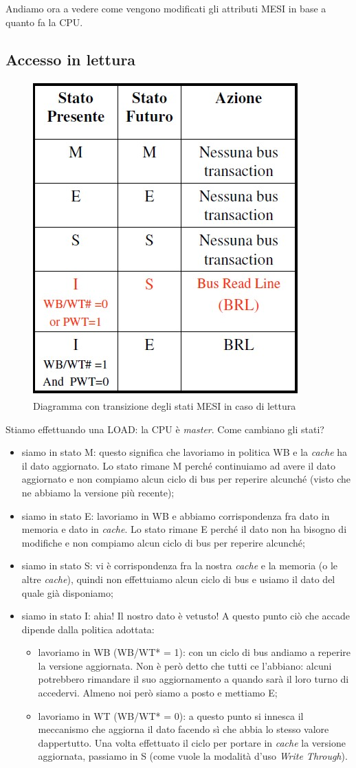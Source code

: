 Andiamo ora a vedere come vengono modificati gli attributi MESI in base a quanto fa la CPU.

\subsection{Accesso in lettura}
\label{sec:accessoLettura}

\begin{figure}[!h]
\centering
\includegraphics[width=0.35\columnwidth]{img/transLettura}
\caption{Diagramma con transizione degli stati MESI in caso di lettura}
\label{fig:transLettura}
\end{figure}

Stiamo effettuando una LOAD: la CPU è \textit{master}. Come cambiano gli stati?

\begin{itemize}
\item siamo in stato M: questo significa che lavoriamo in politica WB e la \textit{cache} ha il dato aggiornato. Lo stato rimane M perché continuiamo ad avere il dato aggiornato e non compiamo alcun ciclo di bus per reperire alcunché (visto che ne abbiamo la versione più recente);
\item siamo in stato E: lavoriamo in WB e abbiamo corrispondenza fra dato in memoria e dato in\textit{ cache}. Lo stato rimane E perché il dato non ha bisogno di modifiche e non compiamo alcun ciclo di bus per reperire alcunché;
\item siamo in stato S: vi è corrispondenza fra la nostra \textit{cache} e la memoria (o le altre \textit{cache}), quindi non effettuiamo alcun ciclo di bus e usiamo il dato del quale già disponiamo;
\item siamo in stato I: ahia! Il nostro dato è vetusto! A questo punto ciò che accade dipende dalla politica adottata:
\begin{itemize}
\item lavoriamo in WB (WB/WT* = 1): con un ciclo di bus andiamo a reperire la versione aggiornata. Non è però detto che tutti ce l'abbiano: alcuni potrebbero rimandare il suo aggiornamento a quando sarà il loro turno di accedervi. Almeno noi però siamo a posto e mettiamo E;
\item lavoriamo in WT (WB/WT* = 0): a questo punto si innesca il meccanismo che aggiorna il dato facendo sì che abbia lo stesso valore dappertutto. Una volta effettuato il ciclo per portare in \textit{cache} la versione aggiornata, passiamo in S (come vuole la modalità d'uso \textit{Write Through}).
\end{itemize}
\end{itemize}

